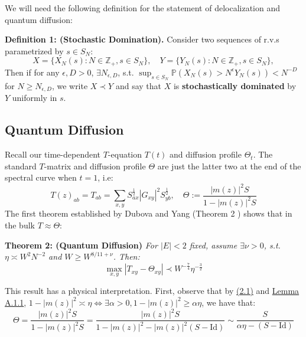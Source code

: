 \documentclass[11pt]{article}
\newenvironment{boxtheorem}[1]
  {\begin{mdframed}\noindent\textbf{#1}\itshape\space}
  {\end{mdframed}}
\newenvironment{boxt}[1]
  {\begin{mdframed}\noindent\textbf{#1}\normalfont\space}
  {\end{mdframed}}
\begin{document}
We will need the following definition for the statement of delocalization and quantum diffusion:
\begin{boxt}{Definition 1: (Stochastic Domination).}\label{def-1}
\noindent Consider two sequences of r.v.s parametrized by $s\in S_N$:\vspace{-0.25 cm}
$$X = \{X_N(s): N\in \mathbb{Z}_+, s\in S_N\}, \quad Y = \{Y_N(s): N\in \mathbb{Z}_+, s\in S_N\},$$
Then if for any $\epsilon, D>0$, $\exists N_{\epsilon, D}$, s.t. $\sup_{s\in S_N}\mathbb{P}\left(X_N(s)>N^\epsilon Y_N(s)\right)<N^{-D}$ for $N\geq N_{\epsilon, D}$, 
we write $X \prec Y$ and say that $X$ is \textbf{stochastically dominated} by $Y$ uniformly in $s$. 
\end{boxt}

\subsection{Quantum Diffusion}
\label{diffusion}
Recall our time-dependent $T$-equation $T(t)$ and diffusion profile $\Theta_t$. The standard $T$-matrix and diffusion profile $\Theta$ are just the latter two at the end of the spectral curve when $t=1$, i.e: $$T(z)_{ab} = T_{ab} = \sum_{x,y}S_{ax}^{\frac{1}{2}} |G_{xy}|^2S_{yb}^{\frac{1}{2}}, \quad \Theta := \frac{|m(z)|^2S}{1-|m(z)|^2S}$$
The first theorem established by Dubova and Yang (Theorem 2 \cite{bandSDE}) shows that in the bulk $T\approx \Theta$:
\begin{boxtheorem}{Theorem 2: (Quantum Diffusion)}
For $|E|<2$ fixed, assume $\exists \nu>0$, s.t. $\eta \asymp W^2 N^{-2}$ and $W\geq W^{8/11+\nu}$. Then: $$\max_{x, y}|T_{xy}-\Theta_{xy}|\prec W^{-\frac{7}{4}}\eta^{-\frac{3}{2}}$$
\end{boxtheorem}
This result has a physical interpretation. First, observe
that by \hyperref[2.1]{(2.1)} and  \hyperref[lemma-a11]{Lemma A.1.1}, $1-|m(z)|^2\asymp \eta\Leftrightarrow \exists \alpha>0, 1-|m(z)|^2\geq \alpha\eta$, we have that: 
 $$\Theta =\frac{|m(z)|^2S}{1-|m(z)|^2S} = \frac{|m(z)|^2S}{1-|m(z)|^2-|m(z)|^2(S-\text{Id})}\sim \frac{S}{\alpha\eta-(S-\text{Id})}$$
\end{document}

